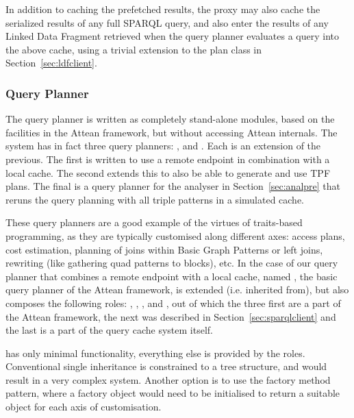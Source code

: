 In addition to caching the prefetched results, the proxy may also
cache the serialized results of any full SPARQL query, and also enter
the results of any Linked Data Fragment retrieved when the query
planner evaluates a query into the above cache, using a trivial
extension to the plan class in Section~\ref{sec:ldfclient}.



\subsubsection{Query Planner}\label{sec:implqueryplan}

The query planner is written as completely stand-alone modules, based
on the facilities in the Attean framework, but without accessing
Attean internals. The system has in fact three query planners:
,
 and
. Each is an
extension of the previous. The first is written to use a remote
endpoint in combination with a local cache. The second extends this to
also be able to generate and use TPF plans. The
final is a query planner for the analyser in Section~\ref{sec:analpre}
that reruns the query planning with all triple patterns in a simulated
cache.

These query planners are a good example of the virtues of traits-based
programming, as they are typically customised along different axes:
access plans, cost estimation, planning of joins within Basic Graph
Patterns or left joins, rewriting (like gathering quad patterns to
blocks), etc. In the case of our query planner that combines a remote
endpoint with a local cache, named
, the basic query planner of the
Attean framework,  is extended
(i.e. inherited from), but also composes the following roles:
,
,
,
 and
, out of which the three
first are a part of the Attean framework, the next was described in
Section~\ref{sec:sparqlclient} and the last is a part of the
query cache system itself.


 has only minimal functionality,
everything else is provided by the roles. Conventional single
inheritance is constrained to a tree structure, and would result in a
very complex system. Another option is to use the factory method
pattern, where a factory object would need to be initialised to return
a suitable object for each axis of customisation. 

